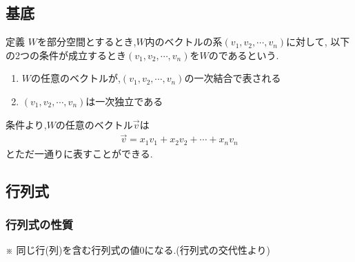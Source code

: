 \documentclass[a4paper]{jsarticle}
\begin{document}
\subsection{基底}
\begin{itembox}[l]{定義}
    $W$を部分空間とするとき,$W$内のベクトルの系$\left(v_1,v_2,\cdots,v_n\right)$に対して,
    以下の2つの条件が成立するとき$\left(v_1,v_2,\cdots,v_n\right)$を$W$のであるという.
    \begin{enumerate}[(1)]
        \item $W$の任意のベクトルが,$\left(v_1,v_2,\cdots,v_n\right)$の一次結合で表される
        \item $\left(v_1,v_2,\cdots,v_n\right)$は一次独立である
    \end{enumerate}
\end{itembox}
条件より,$W$の任意のベクトル$\vec{v}$は
\begin{eqnarray*}
    \vec{v}=x_1v_1+x_2v_2+\cdots+x_nv_n
\end{eqnarray*}
とただ一通りに表すことができる.
\subsection{行列式}
\subsubsection{行列式の性質}
※ 同じ行(列)を含む行列式の値$0$になる.(行列式の交代性より)
\end{document}
